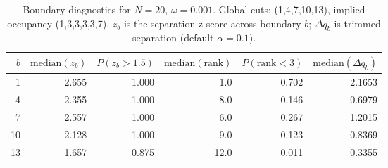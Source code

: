 \begin{table}[t]
\centering
\small
\setlength{\tabcolsep}{4pt}
\renewcommand{\arraystretch}{1.15}
\begin{tabular}{rrrrrr}
\toprule
$b$ & $\mathrm{median}(z_b)$ & $P(z_b>1.5)$ & $\mathrm{median}(\mathrm{rank})$ & $P(\mathrm{rank}<3)$ & $\mathrm{median}(\Delta q_b)$ \\
\midrule
1 & 2.655 & 1.000 & 1.0 & 0.702 & 2.1653 \\
4 & 2.355 & 1.000 & 8.0 & 0.146 & 0.6979 \\
7 & 2.557 & 1.000 & 6.0 & 0.267 & 1.2015 \\
10 & 2.128 & 1.000 & 9.0 & 0.123 & 0.8369 \\
13 & 1.657 & 0.875 & 12.0 & 0.011 & 0.3355 \\
\bottomrule
\end{tabular}
\caption{Boundary diagnostics for $N=20$, $\omega=0.001$. Global cuts: (1,4,7,10,13), implied occupancy (1,3,3,3,3,7). $z_b$ is the separation z-score across boundary $b$; $\Delta q_b$ is trimmed separation (default $\alpha=0.1$).}
\label{tab:boundaries_N20_omega0p001}
\end{table}